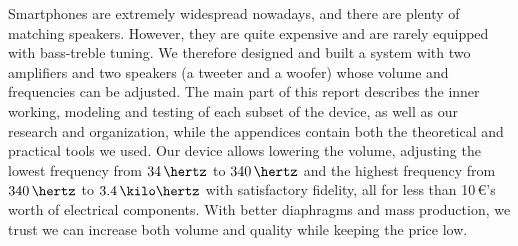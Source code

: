 \biabstract
{
%
%
    Smartphones are extremely widespread nowadays,
    and there are plenty of matching speakers.
    However, they are quite expensive and are rarely
    equipped with bass-treble tuning.
    We therefore designed and built a system with
    two amplifiers and two speakers (a tweeter and a woofer)
    whose volume and frequencies can be adjusted.
    The main part of this report describes the inner working,
    modeling and testing of each subset of the device,
    as well as our research and organization, while
    the appendices contain both the theoretical and practical
    tools we used.
    Our device allows lowering the volume,
    adjusting the lowest frequency from $34\,\hertz$ to $340\,\hertz$ and
    the highest frequency from $340\,\hertz$ to $3.4\,\kilo\hertz$
    with satisfactory fidelity, all for less than 10\,\euro{}'s
    worth of electrical components.
    With better diaphragms and mass production, we trust we can
    increase both volume and quality while keeping
    the price low.
    \newline
}
